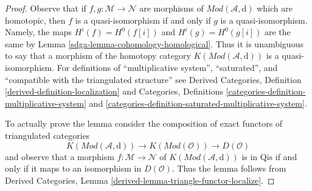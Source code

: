 \begin{proof}

Observe that if $f , g : \mathcal{M} \to \mathcal{N}$ are morphisms
of $\textit{Mod}(\mathcal{A}, \text{d})$ which are homotopic,
then $f$ is a quasi-isomorphism if and only if $g$ is a quasi-isomorphism.
Namely, the maps $H^i(f) = H^0(f[i])$ and $H^i(g) = H^0(g[i])$ are
the same by Lemma \ref{sdga-lemma-cohomology-homological}. Thus it is
unambiguous to say that a morphism of the homotopy category
$K(\textit{Mod}(\mathcal{A}, \text{d}))$ is a quasi-isomorphism.
For definitions of ``multiplicative system'', ``saturated'', and
``compatible with the triangulated structure'' see
Derived Categories, Definition \ref{derived-definition-localization}
and
Categories, Definitions \ref{categories-definition-multiplicative-system}
and \ref{categories-definition-saturated-multiplicative-system}.

\medskip\noindent
To actually prove the lemma consider the composition
of exact functors of triangulated categories
$$
K(\textit{Mod}(\mathcal{A}, \text{d}))
\longrightarrow
K(\textit{Mod}(\mathcal{O}))
\longrightarrow
D(\mathcal{O})
$$
and observe that a morphism $f : \mathcal{M} \to \mathcal{N}$
of $K(\textit{Mod}(\mathcal{A}, \text{d}))$ is in $\text{Qis}$
if and only if it maps to an isomorphism in $D(\mathcal{O})$.
Thus the lemma follows from Derived Categories, Lemma
\ref{derived-lemma-triangle-functor-localize}.
\end{proof}

